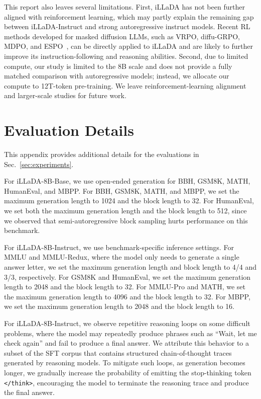 \documentclass{llmxive}
\begin{document}
This report also leaves several limitations. First, iLLaDA has not been further aligned with reinforcement learning, which may partly explain the remaining gap between iLLaDA-Instruct and strong autoregressive instruct models. Recent RL methods developed for masked diffusion LLMs, such as VRPO, diffu-GRPO, MDPO, and ESPO~\citep{zhu2025llada,zhao2025d1,he2025mdpo,ou2025principled}, can be directly applied to iLLaDA and are likely to further improve its instruction-following and reasoning abilities. Second, due to limited compute, our study is limited to the 8B scale and does not provide a fully matched comparison with autoregressive models; instead, we allocate our compute to 12T-token pre-training. We leave reinforcement-learning alignment and larger-scale studies for future work.












\appendix


\section{Evaluation Details}
\label{app:evaluation}

This appendix provides additional details for the evaluations in Sec.~\ref{sec:experiments}.

For iLLaDA-8B-Base, we use open-ended generation for BBH, GSM8K, MATH, HumanEval, and MBPP. For BBH, GSM8K, MATH, and MBPP, we set the maximum generation length to 1024 and the block length to 32. For HumanEval, we set both the maximum generation length and the block length to 512, since we observed that semi-autoregressive block sampling hurts performance on this benchmark.

For iLLaDA-8B-Instruct, we use benchmark-specific inference settings. For MMLU and MMLU-Redux, where the model only needs to generate a single answer letter, we set the maximum generation length and block length to 4/4 and 3/3, respectively. For GSM8K and HumanEval, we set the maximum generation length to 2048 and the block length to 32. For MMLU-Pro and MATH, we set the maximum generation length to 4096 and the block length to 32. For MBPP, we set the maximum generation length to 2048 and the block length to 16.

For iLLaDA-8B-Instruct, we observe repetitive reasoning loops on some difficult problems, where the model may repeatedly produce phrases such as ``Wait, let me check again'' and fail to produce a final answer. We attribute this behavior to a subset of the SFT corpus that contains structured chain-of-thought traces generated by reasoning models. To mitigate such loops, as generation becomes longer, we gradually increase the probability of emitting the stop-thinking token \texttt{\textless/think\textgreater}, encouraging the model to terminate the reasoning trace and produce the final answer.
\end{document}
